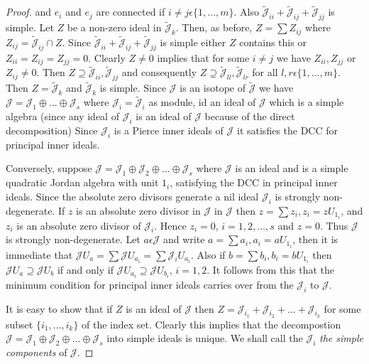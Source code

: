 \begin{proof}
and $e_i$ and $e_j$ are connected if $i\neq j\epsilon \{1,\ldots,
m\}$. Also
$\tilde{\mathscr{J}}_{ii}+\tilde{\mathscr{J}}_{ij}+\tilde{\mathscr{J}}_{jj}$ is
simple. Let $Z$ be a non-zero ideal in
$\tilde{\mathscr{J}}_k$. Then, as before, $Z=\sum
Z_{ij}$ where $Z_{ij}=\tilde{\mathscr{J}}_{ij}\cap
Z$. Since
$\tilde{\mathscr{J}}_{ii}+\tilde{\mathscr{J}}_{ij}+\tilde{\mathscr{J}}_{jj}$ is
simple either $Z$ contains this or
$Z_{ii}=Z_{ij}=Z_{jj}=0$. Clearly
$Z\neq 0$ implies that for some $i\neq j$ we have
$Z_{ii},Z_{jj}$ or $Z_{ij}\neq
0$. Then $Z\supseteq
\tilde{\mathscr{J}}_{ii},\tilde{\mathscr{J}}_{jj}$ and consequently
$Z\supseteq\tilde{\mathscr{J}}_{ll}, \tilde{\mathscr{J}}_{lr}$
for all $l,r\epsilon\{1,\ldots, m\}$. Then
$Z=\tilde{\mathscr{J}}_{k}$ and $\tilde{\mathscr{J}}_{k}$ is
simple. Since $\mathscr{J}$ is an isotope of $\tilde{\mathscr{J}}$ we
have $\mathscr{J}=\mathscr{J}_1\oplus\ldots \oplus \mathscr{J}_s$
where $\mathscr{J}_i=\tilde{\mathscr{J}}_{i}$ as module, id an ideal of
$\mathscr{J}$ which is a simple algebra (since any ideal of
$\mathscr{J}_i$ is an ideal of $\mathscr{J}$ because of the direct
decomposition) Since $\mathscr{J}_i$ is a Pierce inner ideals of
$\mathscr{J}$ it satisfies the DCC for principal inner ideals.

Conversely, suppose
$\mathscr{J}=\mathscr{J}_1\oplus\mathscr{J}_2\oplus\ldots\oplus
\mathscr{J}_s$ where $\mathscr{J}$ is an ideal and is a simple
quadratic Jordan algebra with unit $1_i$, satisfying the\pageoriginale
DCC in principal inner ideals. Since the absolute zero divisors
generate a nil ideal $\mathscr{J}_i$ is strongly non-degenerate. If
$z$ is an absolute zero divisor in $\mathscr{J}$ in $\mathscr{J}$ then
$z=\sum z_i,z_i=zU_{1_i}$, and $z_i$ is an absolute zero divisor of
$\mathscr{J}_i$. Hence $z_i=0$, $i=1,2,\ldots,s$ and $z=0$. Thus
$\mathscr{J}$ is strongly non-degenerate. Let $a\epsilon \mathscr{J}$
and write $a=\sum a_i,a_i= aU_{1_i}$, then it is immediate that
$\mathscr{J}U_a=\sum\mathscr{J}U_{a_i}=\sum\mathscr{J}_iU_{a_i}$. Also
if $b=\sum b_i, b_i=bU_{1_i}$ then $\mathscr{J}U_a\supseteq
\mathscr{J}U_b$ if and only if $\mathscr{J}U_{a_i}\supseteq
\mathscr{J}U_{b_i}$, $i=1,2$. It follows from this that the minimum
condition for principal inner ideals carries over from the
$\mathscr{J}_i$ to $\mathscr{J}$.

It is easy to show that if $Z$ is an ideal of $\mathscr{J}$
then $Z=\mathscr{J}_{i_1}+\mathscr{J}_{i_2}+\ldots
+\mathscr{J}_{i_k}$ for some subset $\{i_1,\ldots, i_k\}$ of the index
set. Clearly this implies that the decompostion
$\mathscr{J}=\mathscr{J}_1\oplus \mathscr{J}_2\oplus\ldots \oplus
\mathscr{J}_s$ into simple ideals is unique. We shall call the
$\mathscr{J}_i$ {\em the simple components} of $\mathscr{J}$.
\end{proof}

